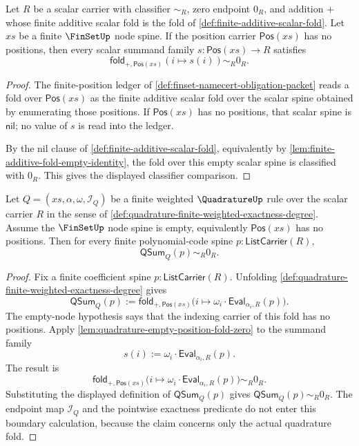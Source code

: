 \begin{lemma}
\label{lem:quadrature-empty-position-fold-zero}
Let $R$ be a scalar carrier with classifier $\sim_R$, zero endpoint $0_R$, and addition $+$ whose finite additive scalar fold is the fold of \autoref{def:finite-additive-scalar-fold}. Let $xs$ be a finite $\FinSetUp$ node spine. If the position carrier $\mathsf{Pos}(xs)$ has no positions, then every scalar summand family $s:\mathsf{Pos}(xs)\to R$ satisfies
$$
\mathsf{fold}_{+,\mathsf{Pos}(xs)}(i\mapsto s(i))\sim_R0_R.
$$
\end{lemma}
\begin{proof}
The finite-position ledger of \autoref{def:finset-namecert-obligation-packet} reads a fold over $\mathsf{Pos}(xs)$ as the finite additive scalar fold over the scalar spine obtained by enumerating those positions. If $\mathsf{Pos}(xs)$ has no positions, that scalar spine is $\mathsf{nil}$; no value of $s$ is read into the ledger.

By the nil clause of \autoref{def:finite-additive-scalar-fold}, equivalently by \autoref{lem:finite-additive-fold-empty-identity}, the fold over this empty scalar spine is classified with $0_R$. This gives the displayed classifier comparison.
\end{proof}

\begin{theorem}
\label{thm:quadrature-empty-node-sum-zero}
Let $Q=(xs,\alpha,\omega,\mathcal I_Q)$ be a finite weighted $\QuadratureUp$ rule over the scalar carrier $R$ in the sense of \autoref{def:quadrature-finite-weighted-exactness-degree}. Assume the $\FinSetUp$ node spine is empty, equivalently $\mathsf{Pos}(xs)$ has no positions. Then for every finite polynomial-code spine $p:\mathsf{ListCarrier}(R)$,
$$
\mathsf{QSum}_Q(p)\sim_R0_R.
$$
\end{theorem}
\begin{proof}
Fix a finite coefficient spine $p:\mathsf{ListCarrier}(R)$. Unfolding \autoref{def:quadrature-finite-weighted-exactness-degree} gives
$$
\mathsf{QSum}_Q(p):=
\mathsf{fold}_{+,\mathsf{Pos}(xs)}
\bigl(i\mapsto \omega_i\cdot\mathsf{Eval}_{\alpha_i,R}(p)\bigr).
$$
The empty-node hypothesis says that the indexing carrier of this fold has no positions. Apply \autoref{lem:quadrature-empty-position-fold-zero} to the summand family
$$
s(i):=\omega_i\cdot\mathsf{Eval}_{\alpha_i,R}(p).
$$
The result is
$$
\mathsf{fold}_{+,\mathsf{Pos}(xs)}
\bigl(i\mapsto \omega_i\cdot\mathsf{Eval}_{\alpha_i,R}(p)\bigr)\sim_R0_R.
$$
Substituting the displayed definition of $\mathsf{QSum}_Q(p)$ gives $\mathsf{QSum}_Q(p)\sim_R0_R$. The endpoint map $\mathcal I_Q$ and the pointwise exactness predicate do not enter this boundary calculation, because the claim concerns only the actual quadrature fold.
\end{proof}

